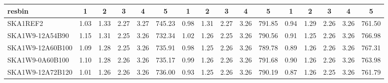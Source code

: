 \begin{table}[H]
{{\begin{tabular}{|lccccc||ccccc||ccccc|}
 resbin  &1 & 2 & 3 & 4 & 5 & 1 & 2 & 3 & 4 & 5 & 1 & 2 & 3 & 4 & 5 \\ \hline
SKA1REF2 & 1.03 \cellcolor{blue!32.23} & 1.33 \cellcolor{red!60.00} & 2.27 \cellcolor{green!60.00} & 3.27 \cellcolor{orange!60.00} & 745.23 \cellcolor{purple!60.00} & 0.98 \cellcolor{blue!46.77} & 1.31 \cellcolor{red!60.00} & 2.27 \cellcolor{green!60.00} & 3.26 \cellcolor{orange!54.55} & 791.85 \cellcolor{purple!60.00} & 0.94 \cellcolor{blue!60.00} & 1.29 \cellcolor{red!60.00} & 2.26 \cellcolor{green!50.38} & 3.26 \cellcolor{orange!42.69} & 761.50 \cellcolor{purple!18.00}\\ \hline 
SKA1W9-12A54B90 & 1.15 \cellcolor{blue!60.00} & 1.31 \cellcolor{red!48.60} & 2.25 \cellcolor{green!18.00} & 3.26 \cellcolor{orange!38.75} & 732.34 \cellcolor{purple!18.00} & 1.02 \cellcolor{blue!60.00} & 1.26 \cellcolor{red!28.29} & 2.25 \cellcolor{green!18.00} & 3.26 \cellcolor{orange!55.09} & 790.56 \cellcolor{purple!33.84} & 0.91 \cellcolor{blue!43.52} & 1.25 \cellcolor{red!18.00} & 2.26 \cellcolor{green!38.56} & 3.26 \cellcolor{orange!33.71} & 766.98 \cellcolor{purple!57.61}\\ \hline 
SKA1W9-12A60B100 & 1.09 \cellcolor{blue!44.85} & 1.28 \cellcolor{red!32.87} & 2.25 \cellcolor{green!28.36} & 3.26 \cellcolor{orange!39.00} & 735.91 \cellcolor{purple!29.65} & 0.98 \cellcolor{blue!44.83} & 1.25 \cellcolor{red!23.18} & 2.26 \cellcolor{green!32.86} & 3.26 \cellcolor{orange!55.64} & 789.78 \cellcolor{purple!18.00} & 0.89 \cellcolor{blue!32.89} & 1.26 \cellcolor{red!23.72} & 2.26 \cellcolor{green!44.69} & 3.26 \cellcolor{orange!32.43} & 767.31 \cellcolor{purple!60.00}\\ \hline 
SKA1W9-0A60B100 & 1.10 \cellcolor{blue!47.31} & 1.28 \cellcolor{red!33.85} & 2.26 \cellcolor{green!39.09} & 3.26 \cellcolor{orange!43.25} & 735.17 \cellcolor{purple!27.24} & 0.99 \cellcolor{blue!47.55} & 1.26 \cellcolor{red!23.60} & 2.26 \cellcolor{green!40.94} & 3.26 \cellcolor{orange!60.00} & 791.68 \cellcolor{purple!56.61} & 0.90 \cellcolor{blue!34.23} & 1.26 \cellcolor{red!27.16} & 2.26 \cellcolor{green!60.00} & 3.26 \cellcolor{orange!25.37} & 763.98 \cellcolor{purple!35.90}\\ \hline 
SKA1W9-12A72B120 & 1.01 \cellcolor{blue!26.99} & 1.26 \cellcolor{red!20.14} & 2.26 \cellcolor{green!42.18} & 3.26 \cellcolor{orange!39.75} & 736.00 \cellcolor{purple!29.93} & 0.93 \cellcolor{blue!26.08} & 1.25 \cellcolor{red!18.00} & 2.26 \cellcolor{green!33.51} & 3.26 \cellcolor{orange!27.27} & 790.19 \cellcolor{purple!26.29} & 0.87 \cellcolor{blue!20.55} & 1.26 \cellcolor{red!33.56} & 2.25 \cellcolor{green!18.00} & 3.26 \cellcolor{orange!18.00} & 761.79 \cellcolor{purple!20.11}\\ \hline 

\end{tabular}}}
\end{table}
